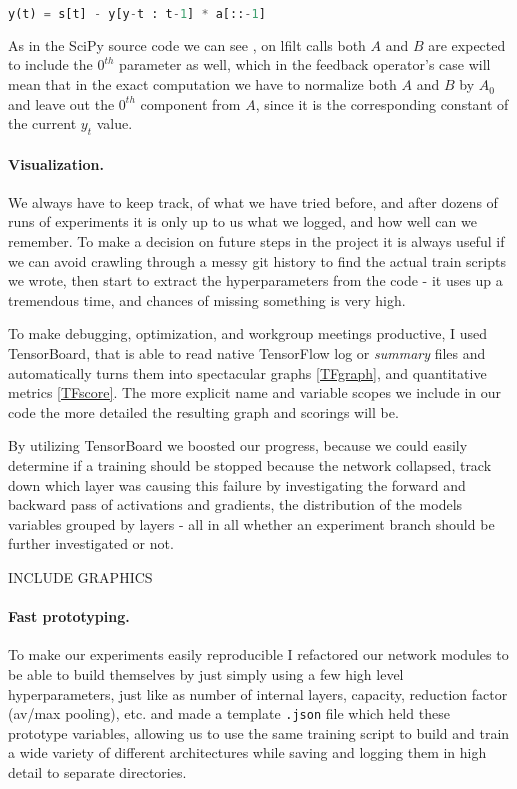 \begin{lstlisting}[language=Python]
y(t) = s[t] - y[y-t : t-1] * a[::-1]
\end{lstlisting}

As in the SciPy source code we can see \cite{scipy-github}, on lfilt calls both $A$ and $B$ are expected to include the $0^{th}$ parameter as well, which in the feedback operator's case will mean that in the exact computation we have to normalize both $A$ and $B$ by $A_0$ and leave out the $0^{th}$ component from $A$, since it is the corresponding constant of the current $y_t$ value.

\paragraph{Visualization.}
We always have to keep track, of what we have tried before, and after dozens of runs of experiments it is only up to us what we logged, and how well can we remember.
To make a decision on future steps in the project it is always useful if we can avoid crawling through a messy git history to find the actual train scripts we wrote, then start to extract the hyperparameters from the code - it uses up a tremendous time, and chances of missing something is very high.

To make debugging, optimization, and workgroup meetings productive, I used TensorBoard, that is able to read native TensorFlow log or \textit{summary} files and automatically turns them into spectacular graphs \ref{TFgraph}, and quantitative metrics \ref{TFscore}.
The more explicit name and variable scopes we include in our code the more detailed the resulting graph and scorings will be.

By utilizing TensorBoard we boosted our progress, because we could easily determine if a training should be stopped because the network collapsed, track down which layer was causing this failure by investigating the forward and backward pass of activations and gradients, the distribution of the models variables grouped by layers - all in all whether an experiment branch should be further investigated or not.

INCLUDE GRAPHICS

\paragraph{Fast prototyping.}
To make our experiments easily reproducible I refactored our network modules to be able to build themselves by just simply using a few high level hyperparameters, just like as number of internal layers, capacity, reduction factor (av/max pooling), etc. and made a template \texttt{.json} file which held these prototype variables, allowing us to use the same training script to build and train a wide variety of different architectures while saving and logging them in high detail to separate directories.

